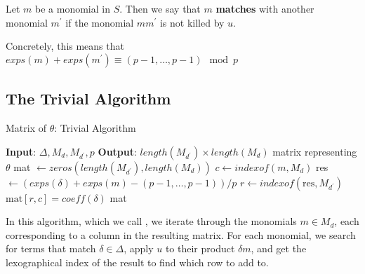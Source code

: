 
\begin{defn}
	Let \(m\) be a monomial in \(S\). 
	Then we say that \(m\) \textbf{matches}
	with another monomial \(m^{\prime}\) 
	if the monomial \(mm^{\prime}\) is
	not killed by \(u\).
\end{defn}

Concretely, this means that $exps(m) + exps(m^{\prime}) \equiv (p - 1, \dots, p - 1) \mod p$


\subsection{The Trivial Algorithm}

\begin{algorithm}[H]
    \caption{Matrix of $\theta$: Trivial Algorithm}
    \label{alg:matrix:trivial}
    \begin{algorithmic}[1]
    \State \textbf{Input}: $\Delta, M_{d}, M_{d^{\prime}}, p$
    \State \textbf{Output}: $length(M_{d^{\prime}}) \times length(M_{d})$ 
	matrix representing $\theta$
    \State mat $\gets zeros(length(M_{d^{\prime}}), length(M_{d}))$
	    \State $c \gets indexof(m, M _{d})$
        \For{$\delta \in \Delta$}
             
			\State res $\gets (exps(\delta) + exps(m) - (p-1, \ldots, p-1)) / p$ 
				\State $r \gets indexof(\text{res},M_{d^{\prime}})$
                \State $\text{mat}[r, c] = coeff(\delta)$
            \EndIf
        \EndFor
    \EndFor
    \State \Return mat
    \end{algorithmic}
\end{algorithm}

In this algorithm, which we call \triv, we iterate through the monomials $m \in M_{d}$, each corresponding to a column in the
resulting matrix. For each monomial, we search for terms that match $\delta \in \Delta$, apply $u$ to their product $\delta m$, and 
get the lexographical index of the result to find which row to add to.

